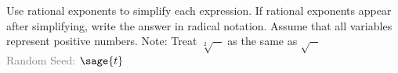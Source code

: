 \documentclass{article}%
\begin{document}

\noindent Use rational exponents to simplify each expression. If rational exponents appear after simplifying, write the answer in radical notation. Assume that all variables represent positive numbers. Note: Treat $\sqrt[2]{-}$ as the same as $\sqrt{-}$ \\
\textcolor{gray}{Random Seed: $\sage{t}$}


\begin{enumerate}
\begin{multicols}{3}
\end{multicols}
\end{enumerate}


\newpage


\begin{multicols}{3}
\begin{enumerate}
\end{enumerate}
\end{multicols}
\end{document}
